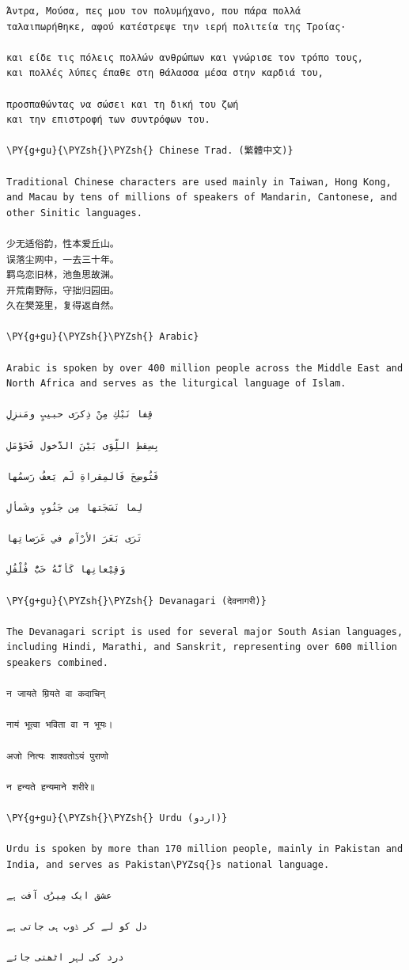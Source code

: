 \documentclass[a4paper,twoside]{article}
\begin{document}
\begin{tscode}[lang=markdown, engine=pygments]
\begin{Verbatim}[commandchars=\\\{\},breaklines, breakanywhere, commandchars=\\\{\}]
Άντρα, Μούσα, πες μου τον πολυμήχανο, που πάρα πολλά
ταλαιπωρήθηκε, αφού κατέστρεψε την ιερή πολιτεία της Τροίας·

και είδε τις πόλεις πολλών ανθρώπων και γνώρισε τον τρόπο τους,
και πολλές λύπες έπαθε στη θάλασσα μέσα στην καρδιά του,

προσπαθώντας να σώσει και τη δική του ζωή
και την επιστροφή των συντρόφων του.

\PY{g+gu}{\PYZsh{}\PYZsh{} Chinese Trad. (繁體中文)}

Traditional Chinese characters are used mainly in Taiwan, Hong Kong, and Macau by tens of millions of speakers of Mandarin, Cantonese, and other Sinitic languages.

少无适俗韵，性本爱丘山。
误落尘网中，一去三十年。
羁鸟恋旧林，池鱼思故渊。
开荒南野际，守拙归园田。
久在樊笼里，复得返自然。

\PY{g+gu}{\PYZsh{}\PYZsh{} Arabic}

Arabic is spoken by over 400 million people across the Middle East and North Africa and serves as the liturgical language of Islam.

قِفا نَبْكِ مِنْ ذِكرَى حبيبٍ ومَنزِلِ

بِسِقطِ اللِّوَى بَيْنَ الدَّخول فَحَوْمَلِ

فَتُوضِحَ فَالمِقراةِ لَم يَعفُ رَسمُها

لِما نَسَجَتها مِن جَنُوبٍ وشَمألِ

تَرَى بَعَرَ الأرْآمِ في عَرَصاتِها

وَقِيْعانِها كَأنَّهُ حَبُّ فُلْفُلِ

\PY{g+gu}{\PYZsh{}\PYZsh{} Devanagari (देवनागरी)}

The Devanagari script is used for several major South Asian languages, including Hindi, Marathi, and Sanskrit, representing over 600 million speakers combined.

न जायते म्रियते वा कदाचिन्

नायं भूत्वा भविता वा न भूयः।

अजो नित्यः शाश्वतोऽयं पुराणो

न हन्यते हन्यमाने शरीरे॥

\PY{g+gu}{\PYZsh{}\PYZsh{} Urdu (اردو)}

Urdu is spoken by more than 170 million people, mainly in Pakistan and India, and serves as Pakistan\PYZsq{}s national language.

عشق ایک مِیرُی آفت ہے

دل کو لے کر ڈوب ہی جاتی ہے

درد کی لہر اٹھتی جائے


\end{Verbatim}
\end{tscode}
\end{document}
